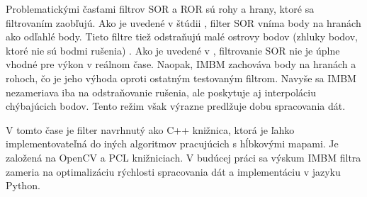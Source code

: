Problematickými časťami filtrov SOR a ROR sú rohy a hrany, ktoré sa filtrovaním zaobľujú. Ako je uvedené v štúdii \cite{Pirate}, filter SOR vníma body na hranách ako odľahlé body. Tieto filtre tiež odstraňujú malé ostrovy bodov (zhluky bodov, ktoré nie sú bodmi rušenia) \cite{Schaller}. Ako je uvedené v \cite{Balta}, filtrovanie SOR nie je úplne vhodné pre výkon v reálnom čase.
Naopak, IMBM zachováva body na hranách a rohoch, čo je jeho výhoda oproti ostatným testovaným filtrom. Navyše sa IMBM nezameriava iba na odstraňovanie rušenia, ale poskytuje aj interpoláciu chýbajúcich bodov. Tento režim však výrazne predlžuje dobu spracovania dát. 

V tomto čase je filter navrhnutý ako C++ knižnica, ktorá je ľahko implementovateľná do iných algoritmov pracujúcich s hĺbkovými mapami. Je založená na OpenCV a PCL knižniciach. V budúcej práci sa výskum IMBM filtra zameria na optimalizáciu rýchlosti spracovania dát a implementáciu v jazyku Python.